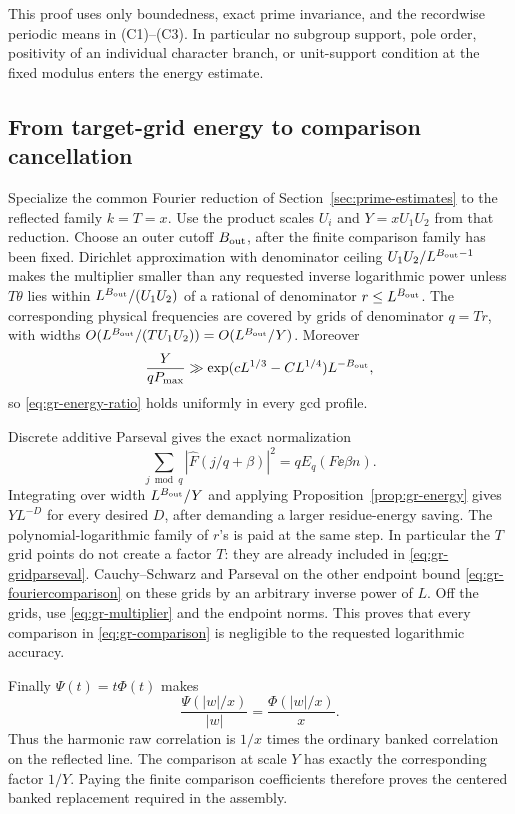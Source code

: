 This proof uses only boundedness, exact prime invariance, and the
recordwise periodic means in \textup{(C1)--(C3)}. In particular no
subgroup support, pole order, positivity of an individual character
branch, or unit-support condition at the fixed modulus enters the
energy estimate.

\subsection{From target-grid energy to comparison cancellation}

Specialize the common Fourier reduction of
Section~\ref{sec:prime-estimates} to the reflected family \(k=T=x\).
Use the product scales \(U_i\) and \(Y=xU_1U_2\) from that reduction.
Choose an outer cutoff \(B_{\rm out}\), after the finite comparison
family has been fixed.
Dirichlet approximation with denominator ceiling
\(U_1U_2/L^{B_{\rm out}-1}\) makes the multiplier smaller than any
requested inverse logarithmic power unless \(T\theta\) lies within
\(L^{B_{\rm out}}/(U_1U_2)\) of a rational of denominator
\(r\le L^{B_{\rm out}}\).
The corresponding physical frequencies are covered by grids
of denominator \(q=Tr\), with widths
\(O(L^{B_{\rm out}}/(TU_1U_2))=O(L^{B_{\rm out}}/Y)\).
Moreover
\[
 \frac{Y}{qP_{\max}}
 \gg \exp(cL^{1/3}-CL^{1/4})L^{-B_{\rm out}},
\]
so \eqref{eq:gr-energy-ratio} holds uniformly in every gcd profile.

Discrete additive Parseval gives the exact normalization
\begin{equation}
 \sum_{j\bmod q}|\widehat F(j/q+\beta)|^2
                         =qE_q(F\ee{\beta n}).        \label{eq:gr-gridparseval}
\end{equation}
Integrating over width \(L^{B_{\rm out}}/Y\) and applying
Proposition~\ref{prop:gr-energy} gives \(YL^{-D}\) for every desired
\(D\), after demanding a larger residue-energy saving.
The polynomial-logarithmic family of \(r\)'s is paid at the same step.
In particular the \(T\) grid points do not create a factor \(T\):
they are already included in \eqref{eq:gr-gridparseval}.
Cauchy--Schwarz and Parseval on the other endpoint bound
\eqref{eq:gr-fouriercomparison} on these grids by an arbitrary inverse
power of \(L\).  Off the grids, use
\eqref{eq:gr-multiplier} and the endpoint norms.
This proves that every comparison in \eqref{eq:gr-comparison} is
negligible to the requested logarithmic accuracy.

Finally \(\Psi(t)=t\Phi(t)\) makes
\[
               \frac{\Psi(|w|/x)}{|w|}
                       =\frac{\Phi(|w|/x)}x.
\]
Thus the harmonic raw correlation is \(1/x\) times the ordinary
banked correlation on the reflected line.
The comparison at scale \(Y\) has exactly the corresponding factor
\(1/Y\).  Paying the finite comparison coefficients therefore proves
the centered banked replacement required in the assembly.

